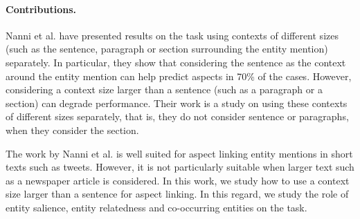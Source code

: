 \documentclass[sigconf,authordraft]{acmart}
\begin{document}
\paragraph{\textbf{Contributions.}} 
Nanni et al. \cite{nanni2018entity} have presented results on the task using contexts of different sizes (such as the sentence, paragraph or section surrounding the entity mention) separately. In particular, they show that considering the sentence as the context around the entity mention can help predict aspects in 70\% of the cases. However, considering a context size larger than a sentence (such as a paragraph or a section) can degrade performance. Their work is a study on using these contexts of different sizes separately, that is, they do not consider sentence or paragraphs, when they consider the section.

The work by Nanni et al. \cite{nanni2018entity} is well suited for aspect linking entity mentions in short texts such as tweets. However, it is not particularly suitable when larger text such as a newspaper article is considered. In this work, we study how to use a context size larger than a sentence for aspect linking. In this regard, we study the role of entity salience, entity relatedness and co-occurring entities on the task.


\end{document}
